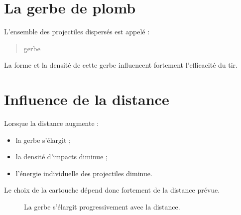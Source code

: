 \section{La gerbe de plomb}

L'ensemble des projectiles dispersés est appelé :

\begin{quote}
gerbe
\end{quote}

La forme et la densité de cette gerbe influencent fortement l'efficacité du
tir.

\section{Influence de la distance}

Lorsque la distance augmente :

\begin{itemize}
    \item la gerbe s'élargit ;
    \item la densité d'impacts diminue ;
    \item l'énergie individuelle des projectiles diminue.
\end{itemize}

Le choix de la cartouche dépend donc fortement de la distance prévue.

\begin{figure}[htbp]
\centering


\caption{La gerbe s'élargit progressivement avec la distance.}
\label{fig:gerbe_distance}

\end{figure}

